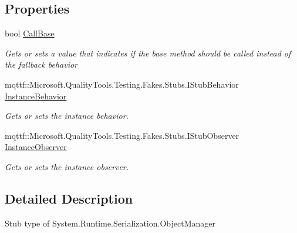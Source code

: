 \subsection*{Properties}
\begin{DoxyCompactItemize}
\item 
bool \hyperlink{class_system_1_1_runtime_1_1_serialization_1_1_fakes_1_1_stub_object_manager_a91ac68203462c085025edc742824011b}{Call\-Base}
\begin{DoxyCompactList}\small\item\em Gets or sets a value that indicates if the base method should be called instead of the fallback behavior\end{DoxyCompactList}\item 
mqttf\-::\-Microsoft.\-Quality\-Tools.\-Testing.\-Fakes.\-Stubs.\-I\-Stub\-Behavior \hyperlink{class_system_1_1_runtime_1_1_serialization_1_1_fakes_1_1_stub_object_manager_abe4cbfe267d25c77edaf4e2f17670e7a}{Instance\-Behavior}
\begin{DoxyCompactList}\small\item\em Gets or sets the instance behavior.\end{DoxyCompactList}\item 
mqttf\-::\-Microsoft.\-Quality\-Tools.\-Testing.\-Fakes.\-Stubs.\-I\-Stub\-Observer \hyperlink{class_system_1_1_runtime_1_1_serialization_1_1_fakes_1_1_stub_object_manager_ac6b024fe2c8621bac628d3530cd5368d}{Instance\-Observer}
\begin{DoxyCompactList}\small\item\em Gets or sets the instance observer.\end{DoxyCompactList}\end{DoxyCompactItemize}


\subsection{Detailed Description}
Stub type of System.\-Runtime.\-Serialization.\-Object\-Manager



